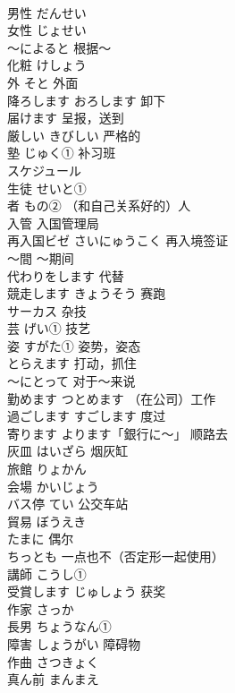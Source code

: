 \documentclass[8pt]{extreport}
\begin{document}
\begin{CJK}{UTF8}{min}
\\	男性	だんせい	
\\	女性	じょせい	
\\	〜によると	根据～	
\\	化粧	けしょう	
\\	外	そと 外面	
\\	降ろします	おろします 卸下	
\\	届けます	呈报，送到	
\\	厳しい	きびしい 严格的	
\\	塾	じゅく① 补习班	
\\	スケジュール	
\\	生徒	せいと①	
\\	者	もの② （和自己关系好的）人	
\\	入管	入国管理局	
\\	再入国ビゼ	さいにゅうこく 再入境签证	
\\	〜間	～期间	
\\	代わりをします	代替	
\\	競走します	きょうそう 赛跑	
\\	サーカス	杂技	
\\	芸	げい① 技艺	
\\	姿	すがた① 姿势，姿态	
\\	とらえます	打动，抓住	
\\	〜にとって	对于～来说	
\\	勤めます	つとめます （在公司）工作	
\\	過ごします	すごします 度过	
\\	寄ります	よります「銀行に〜」 顺路去	
\\	灰皿	はいざら 烟灰缸	
\\	旅館	りょかん	
\\	会場	かいじょう	
\\	バス停	てい 公交车站	
\\	貿易	ぼうえき	
\\	たまに	偶尔	
\\	ちっとも	一点也不（否定形一起使用）	
\\	講師	こうし①	
\\	受賞します	じゅしょう 获奖	
\\	作家	さっか	
\\	長男	ちょうなん①	
\\	障害	しょうがい 障碍物	
\\	作曲	さつきょく	
\\	真ん前	まんまえ	
\end{CJK}
\end{document}
